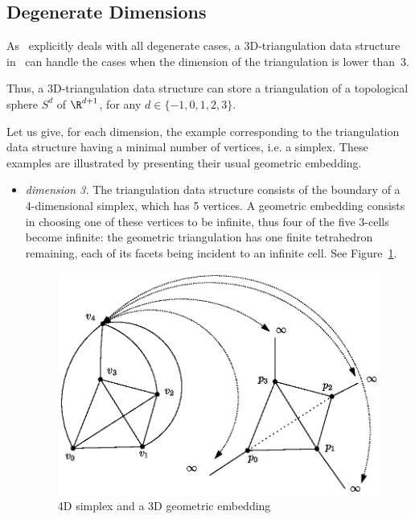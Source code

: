 \subsection{Degenerate Dimensions}
\label{TDS3-sec-degen_dim}
As \cgal\ explicitly deals with all degenerate cases, a
3D-triangulation data structure in \cgal\ can handle the cases when
the dimension of the triangulation is lower than~3.

Thus, a 3D-triangulation data structure can store a triangulation of a
topological sphere $S^d$ of $\R^{d+1}$, for any $d \in \{-1,0,1,2,3\}$. 

Let us give, for each dimension, the example corresponding to the
triangulation data structure having a minimal number of vertices, i.e. a 
simplex. These examples are illustrated by presenting their usual
geometric embedding. 
\begin{itemize}
\item \emph{dimension 3.} The triangulation data structure consists of
the boundary of a 4-dimensional simplex, which has 5 vertices. A
geometric embedding consists in choosing one of these vertices to be
infinite, thus four of the five 3-cells become infinite: the geometric
triangulation has one finite tetrahedron remaining, each of its facets
being incident to an infinite cell. See Figure~\ref{TDS3-fig-topo-simplex4}.
\begin{ccTexOnly}
\begin{figure}
\begin{center} 
\includegraphics{topo-simplex4.eps}
\end{center}
\caption{4D simplex and a 3D geometric embedding \label{TDS3-fig-topo-simplex4}}
\end{figure} 

\end{ccTexOnly}
\end{itemize}
